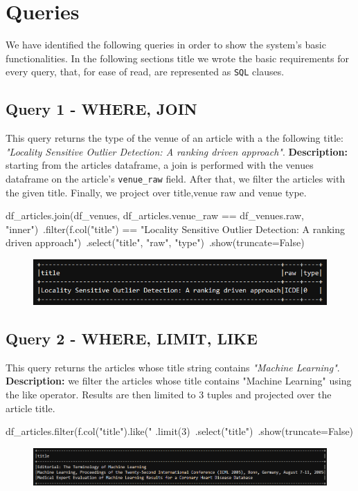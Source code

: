 \documentclass{Configuration_Files/PoliMi3i_thesis}
\begin{document}
\section{Queries}
We have identified the following queries in order to show the system's basic functionalities.\newline
In the following sections title we wrote the basic requirements for every query, that, for ease of read, are represented
as \verb |SQL| clauses.

\subsection{Query 1 - WHERE, JOIN}
This query returns the type of the venue of an article with a the following title: \emph{"Locality Sensitive Outlier Detection:
A ranking driven approach"}.\newline
\textbf{Description:} starting from the articles dataframe, a join is performed with the venues dataframe on the article's
\verb|venue_raw| field. After that, we filter the articles with the given title. Finally, we project over title,venue raw and venue type.\newline
\begin{python}
df_articles.join(df_venues, df_articles.venue_raw == df_venues.raw, "inner")\
           .filter(f.col("title") == "Locality Sensitive Outlier Detection: A ranking driven approach")\
           .select("title", "raw", "type")\
           .show(truncate=False)
\end{python}
\begin{figure}[H]
\centering
\includegraphics[width=1\textwidth]{query/spark_q1.PNG}
\label{fig:query1}
\end{figure}

\subsection{Query 2 - WHERE, LIMIT, LIKE}
This query returns the articles whose title string contains \emph{"Machine Learning"}.\newline
\textbf{Description:} we filter the articles whose title contains "Machine Learning" using the like operator. Results are then limited
to 3 tuples and projected over the article title.\newline
\begin{python}
df_articles.filter(f.col("title").like("%
           .limit(3)\
           .select("title")\
           .show(truncate=False)
\end{python}
\begin{figure}[H]
\centering
\includegraphics[width=1\textwidth]{query/spark_q2.PNG}
\label{fig:query2}
\end{figure}
\end{document}
